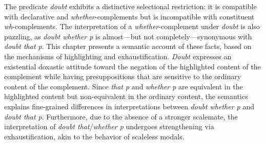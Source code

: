 The predicate \textit{doubt} exhibits a distinctive selectional restriction: it is compatible with declarative and \textit{whether}-complements but is incompatible with constituent \textit{wh}-complements. The interpretation of a \textit{whether}-complement under \textit{doubt} is also puzzling, as \textit{doubt whether p} is almost—but not completely—synonymous with \textit{doubt that p}. This chapter presents a semantic account of these facts, based on the mechanisms of highlighting and exhaustification. \textit{Doubt} expresses an existential doxastic attitude toward the negation of the highlighted content of the complement while having presuppositions that are sensitive to the ordinary content of the complement. Since \textit{that p} and \textit{whether p} are equivalent in the highlighted content but non-equivalent in the ordinary content, the semantics explains fine-grained differences in interpretations between \textit{doubt whether p} and \textit{doubt that p}. Furthermore, due to the absence of a stronger scalemate, the interpretation of \textit{doubt that}/\textit{whether p} undergoes strengthening via exhaustification, akin to the behavior of scaleless modals.
\endinput